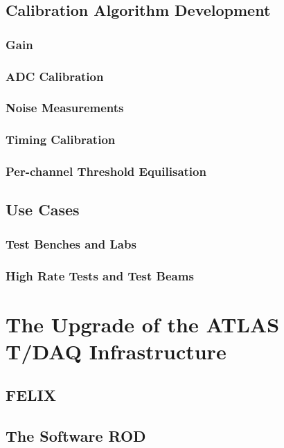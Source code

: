 \subsection{Calibration Algorithm Development}
\subsubsection{Gain}
\subsubsection{ADC Calibration}
\subsubsection{Noise Measurements}
\subsubsection{Timing Calibration}
\subsubsection{Per-channel Threshold Equilisation}
\subsection{Use Cases}
\subsubsection{Test Benches and Labs}
\subsubsection{High Rate Tests and Test Beams}

\section{The Upgrade of the ATLAS T/DAQ Infrastructure}
\subsection{FELIX}
\subsection{The Software ROD}
